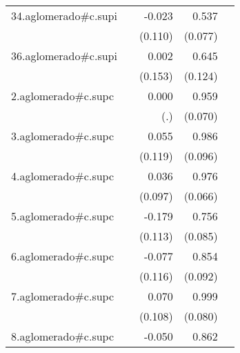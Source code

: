 {\begin{longtable}{l*{4}{D{.}{.}{-1}}}
\addlinespace
34.aglomerado#c.supi&                     &      -0.023         &       0.537\sym{***}&                     \\
            &                     &     (0.110)         &     (0.077)         &                     \\
\addlinespace
36.aglomerado#c.supi&                     &       0.002         &       0.645\sym{***}&                     \\
            &                     &     (0.153)         &     (0.124)         &                     \\
\addlinespace
2.aglomerado#c.supc&                     &       0.000         &       0.959\sym{***}&                     \\
            &                     &         (.)         &     (0.070)         &                     \\
\addlinespace
3.aglomerado#c.supc&                     &       0.055         &       0.986\sym{***}&                     \\
            &                     &     (0.119)         &     (0.096)         &                     \\
\addlinespace
4.aglomerado#c.supc&                     &       0.036         &       0.976\sym{***}&                     \\
            &                     &     (0.097)         &     (0.066)         &                     \\
\addlinespace
5.aglomerado#c.supc&                     &      -0.179         &       0.756\sym{***}&                     \\
            &                     &     (0.113)         &     (0.085)         &                     \\
\addlinespace
6.aglomerado#c.supc&                     &      -0.077         &       0.854\sym{***}&                     \\
            &                     &     (0.116)         &     (0.092)         &                     \\
\addlinespace
7.aglomerado#c.supc&                     &       0.070         &       0.999\sym{***}&                     \\
            &                     &     (0.108)         &     (0.080)         &                     \\
\addlinespace
8.aglomerado#c.supc&                     &      -0.050         &       0.862\sym{***}&                     \\

\end{longtable}}
